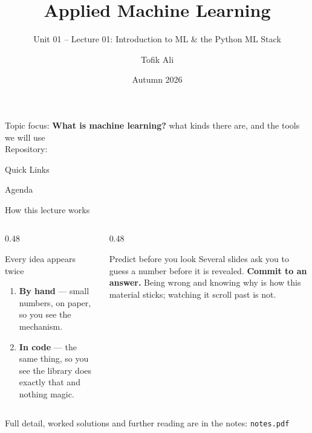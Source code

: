 \documentclass[aspectratio=169]{beamer}
\title[Applied Machine Learning]{Applied Machine Learning}
\subtitle{Unit 01 -- Lecture 01: Introduction to ML \& the Python ML Stack}
\author{Tofik Ali}
\institute{School of Computer Science, UPES Dehradun}
\date{Autumn 2026}
\begin{document}
\UPESCoverFrame
\setcounter{framenumber}{0}

\begin{frame}
  \titlepage
  \vspace{0.3em}
  \begin{center}
    \footnotesize Topic focus: \textbf{What is machine learning?} what kinds there are, and the tools we will use\\[0.25em]
    \footnotesize Repository: \texttt{\AMLRepoURL}
  \end{center}
  \slidesources{\AMLUnitISources}
\end{frame}

\begin{frame}{Quick Links}
  \centering
  \hyperlink{sec:course}{}\hspace{0.5em}
  \hyperlink{sec:whatisml}{}\hspace{0.5em}
  \hyperlink{sec:types}{}\hspace{0.5em}
  \hyperlink{sec:general}{}\hspace{0.5em}
  \hyperlink{sec:stack}{}\hspace{0.5em}
  \hyperlink{sec:summary}{}
\end{frame}

\begin{frame}{Agenda}
  \tableofcontents
\end{frame}

\begin{frame}[shrink=6]{How this lecture works}
  \begin{columns}[T]
    \begin{column}{0.48\textwidth}
      \begin{block}{Every idea appears twice}
        \begin{enumerate}
          \item \textbf{By hand} --- small numbers, on paper, so you see the
            mechanism.
          \item \textbf{In code} --- the same thing, so you see the library
            does exactly that and nothing magic.
        \end{enumerate}
      \end{block}
    \end{column}
    \begin{column}{0.48\textwidth}
      \begin{alertblock}{Predict before you look}
        Several slides ask you to guess a number before it is revealed.
        \textbf{Commit to an answer.} Being wrong and knowing why is how this
        material sticks; watching it scroll past is not.
      \end{alertblock}
    \end{column}
  \end{columns}
  \vspace{0.3em}
  \begin{center}\small
  Full detail, worked solutions and further reading are in the notes:
  \texttt{notes.pdf}
  \end{center}
\end{frame}
\end{document}
